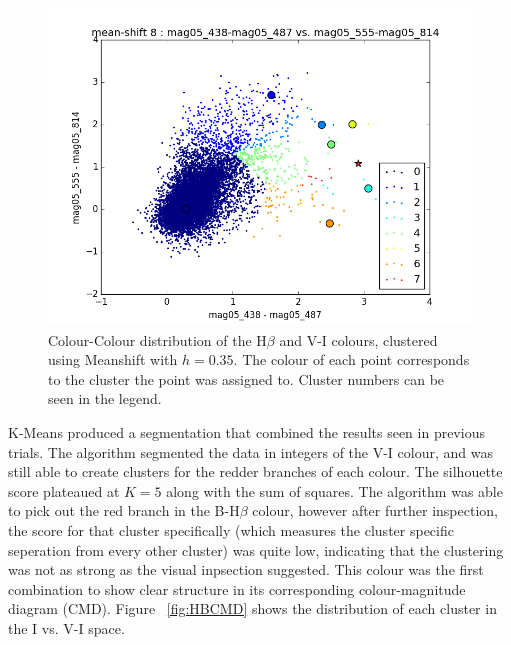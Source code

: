 \begin{figure}
\centering
\includegraphics[width=\linewidth]{figs/meanshift_color_8cl_mag05_438-mag05_487vsmag05_555-mag05_814}
\caption{Colour-Colour distribution of the H$\beta$ and V-I colours, clustered using Meanshift with $h=0.35$. The colour of each point corresponds to the cluster the point was assigned to. Cluster numbers can be seen in the legend.}
\label{fig:HBMS}
\end{figure}

K-Means produced a segmentation that combined the results seen in previous trials.
The algorithm segmented the data in integers of the V-I colour, and was still able to create clusters for the redder branches of each colour.
The silhouette score plateaued at $K=5$ along with the sum of squares.
The algorithm was able to pick out the red branch in the B-H$\beta$ colour, however after further inspection, the score for that cluster specifically (which measures the cluster specific seperation from every other cluster) was quite low, indicating that the clustering was not as strong as the visual inpsection suggested.
This colour was the first combination to show clear structure in its corresponding colour-magnitude diagram (CMD).
Figure ~\ref{fig:HBCMD} shows the distribution of each cluster in the I vs. V-I space.

